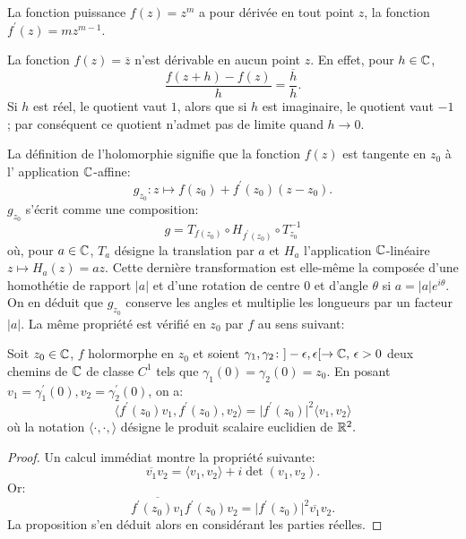 \begin{exem}
La fonction puissance $f(z)=z^m$ a pour dérivée en tout point $z$, la fonction $f^\prime (z)=m z^{m-1}$. \end{exem}
\begin{exem}
 La fonction $f(z)=\overline{z}$ n'est dérivable en aucun point $z$. En effet, pour $h \in \mathbb{C}$,
\[\frac{f(z + h) - f(z)}{h}= \frac{\overline{h}}{h}.\]
Si $h$ est réel, le quotient vaut $1$, alors que si $h$ est imaginaire, le quotient vaut $-1$ ; par conséquent ce quotient n'admet pas de limite quand $h \rightarrow 0$. 
\end{exem}

La définition de l'holomorphie signifie que la fonction $f(z)$ est tangente en $z_0$ à l' application $\mathbb{C}$-affine:
\begin{equation}
  \label{eq:app_c_tangente}
  g_{z_0} \colon z \mapsto f(z_0) + f^\prime(z_0)(z-z_0).
\end{equation} 
$g_{z_0}$ s'écrit comme une composition:
\begin{equation}
  g = T_{f(z_0)}\circ H_{f^\prime(z_0)} \circ T_{z_0}^{-1}
\end{equation} 
où, pour $a \in \mathbb{C}$,  $T_a$ désigne la translation par $a$ et $H_a$ l'application $\mathbb{C}$-linéaire $z \mapsto H_a(z) = az.$ Cette dernière 
transformation est elle-même la composée d'une homothétie de rapport $\lvert a \rvert$ et d'une rotation de centre $0$ et d'angle $\theta$ 
si $a=\lvert a \rvert e^{i \theta} .$ 
On en déduit que $g_{z_0}$ conserve les angles et multiplie les longueurs par un facteur $\lvert a \rvert.$
La même propriété est vérifié en $z_0$ par $f$ au sens suivant:
\begin{fprop}
  \label{prop:fprime_confo}
Soit $z_0 \in \mathbb{C}$, $f$ holormorphe en $z_0$ et soient $\gamma_1, \gamma_2 \colon ]-\epsilon, \epsilon [  \to \mathbb{C}, \, \epsilon > 0$ deux chemins de $\mathbb{C}$
de classe $C^1$ tels que $\gamma_1(0) = \gamma_2(0) = z_0.$ En posant $v_1= \gamma_1^\prime(0), v_2 = \gamma_2^\prime(0)$, on a: 
\begin{equation}
  \langle f^\prime(z_0) v_1, f^\prime(z_0),v_2 \rangle = \lvert f^\prime(z_0) \rvert^2 \langle v_1, v_2 \rangle
\end{equation}
où la notation $\langle \cdot, \cdot, \rangle$ désigne le produit scalaire euclidien de $\mathbb R^2.$
\end{fprop}
\begin{proof}
  Un calcul immédiat montre la propriété suivante:
  \begin{equation}
    \overline{v_1}v_2 = \langle v_1, v_2 \rangle + i \det \left( v_1, v_2 \right).
  \end{equation}
  Or:
  \begin{equation}
    \overline{f^\prime(z_0)v_1}f^\prime(z_0)v_2 = \lvert f^\prime(z_0) \rvert^2 \overline{v_1}v_2.
  \end{equation}
  La proposition s'en déduit alors en considérant les parties réelles.
\end{proof}
